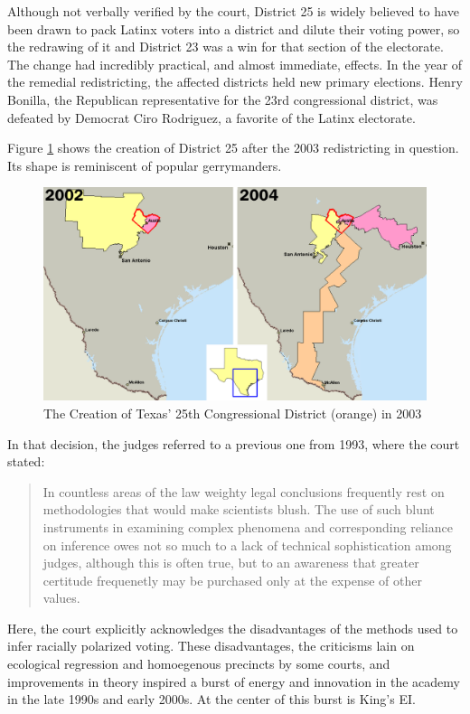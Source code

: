Although not verbally verified by the court, District 25 is widely believed to have been drawn to pack Latinx voters into a district and dilute their voting power, so the redrawing of it and District 23 was a win for that section of the electorate. The change had incredibly practical, and almost immediate, effects. In the year of the remedial redistricting, the affected districts held new primary elections. Henry Bonilla, the Republican representative for the 23rd congressional district, was defeated by Democrat Ciro Rodriguez, a favorite of the Latinx electorate.

Figure \ref{fig:district25} shows the creation of District 25 after the 2003 redistricting in question. Its shape is reminiscent of popular gerrymanders.

\begin{figure}[ht]\centering
 \includegraphics[width=.75\linewidth]{figures/district25.png}
 \caption{The Creation of Texas' 25th Congressional District (orange) in 2003\cite{district25}}
 \label{fig:district25}
\end{figure}

In that decision, the judges referred to a previous one from 1993, where the court stated:

\begin{quote}
 In countless areas of the law weighty legal conclusions frequently rest on methodologies that would make scientists blush. The use of such blunt instruments in examining complex phenomena and corresponding reliance on inference owes not so much to a lack of technical sophistication among judges, although this is often true, but to an awareness that greater certitude frequenetly may be purchased only at the expense of other values.\cite{clements}
\end{quote}

Here, the court explicitly acknowledges the disadvantages of the methods used to infer racially polarized voting. These disadvantages, the criticisms lain on ecological regression and homoegenous precincts by some courts, and improvements in theory inspired a burst of energy and innovation in the academy in the late 1990s and early 2000s. At the center of this burst is King's EI.


